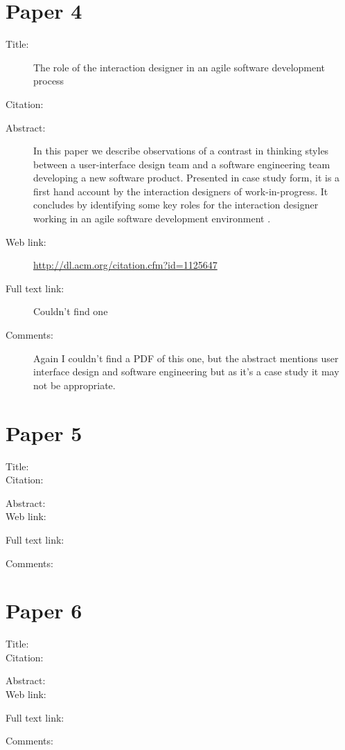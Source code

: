 \documentclass{scrartcl}
\begin{document}
\section*{Paper 4}
\begin{description}
	\item[Title:] The role of the interaction designer in an agile software development process
	\item[Citation:] \cite{Lievesley}
	\item[Abstract:] In this paper we describe observations of a contrast in thinking styles between a user-interface design team and a software engineering team developing a new software product. Presented in case study form, it is a first hand account by the interaction designers of work-in-progress. It concludes by identifying some key roles for the interaction designer working in an agile software development environment .
	\item[Web link:] \url{http://dl.acm.org/citation.cfm?id=1125647}
	\item[Full text link:] Couldn't find one
	\item[Comments:]  Again I couldn't find a PDF of this one, but the abstract mentions user interface design and software engineering but as it's a case study it may not be appropriate.
\end{description}


\section*{Paper 5}
\begin{description}
	\item[Title:] 
	\item[Citation:] \cite{}
	\item[Abstract:] 
	\item[Web link:] \url{}
	\item[Full text link:] \url{}
	\item[Comments:]  
\end{description}

\section*{Paper 6}
\begin{description}
	\item[Title:] 
	\item[Citation:] \cite{}
	\item[Abstract:] 
	\item[Web link:] \url{}
	\item[Full text link:] \url{}
	\item[Comments:]  
\end{description}




\end{document}
